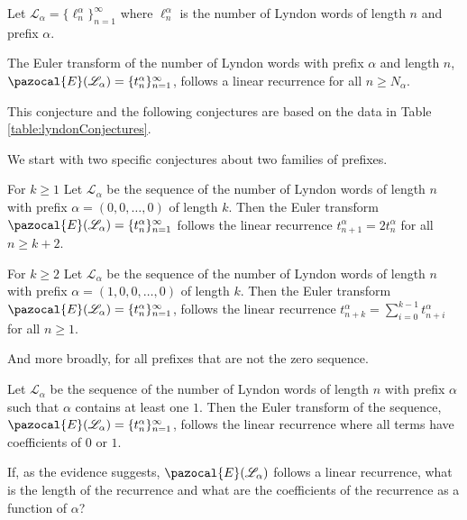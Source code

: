 \begin{definition}
  Let $\mathcal{L}_\alpha = \{\ell_n^\alpha\}_{n=1}^\infty$ where
  $\ell_n^\alpha$ is the number of Lyndon words of length $n$ and prefix
  $\alpha$.
\end{definition}

\begin{conjecture}
  The Euler transform of the number of Lyndon words with prefix $\alpha$ and
  length $n$,
  $\pazocal{E}(\mathcal{L_\alpha}) = \{t_{n}^\alpha\}_{n=1}^\infty$,
  follows a linear recurrence for all $n \geq N_\alpha$.
\end{conjecture}

This conjecture and the following conjectures are based on the data
in Table \ref{table:lyndonConjectures}.

We start with two specific conjectures about two families of prefixes.
\begin{conjecture}
  For $k \geq 1$
  Let $\mathcal{L}_\alpha$ be the sequence of the
  number of Lyndon words of length $n$ with prefix
  ${\alpha = (0, 0, \dots, 0)}$ of length $k$.
  Then the Euler transform
  $\pazocal{E}(\mathcal{L}_\alpha) = \{t_{n}^\alpha\}_{n=1}^\infty$
  follows the linear recurrence $t_{n+1}^\alpha = 2t_{n}^\alpha$ for all
  $n \geq k + 2$.
\end{conjecture}

\begin{conjecture}
  For $k \geq 2$
  Let $\mathcal{L}_\alpha$ be the sequence of the
  number of Lyndon words of length $n$ with prefix
  ${\alpha = (1, 0, 0, \dots, 0)}$ of length $k$.
  Then the Euler transform
  $\pazocal{E}(\mathcal{L}_\alpha) = \{t_{n}^\alpha\}_{n=1}^\infty$,
  follows the linear recurrence $t_{n+k}^\alpha = \sum_{i=0}^{k-1} t_{n+i}^\alpha$
  for all $n \geq 1$.
\end{conjecture}

And more broadly, for all prefixes that are not the zero sequence.
\begin{conjecture}
  Let $\mathcal{L}_\alpha$ be the sequence of the
  number of Lyndon words of length $n$ with prefix $\alpha$ such that $\alpha$
  contains at least one $1$.
  Then the Euler transform of the sequence,
  $\pazocal{E}(\mathcal{L_\alpha}) = \{t_{n}^\alpha\}_{n=1}^\infty$,
  follows the linear recurrence where all terms have coefficients of $0$ or $1$.
\end{conjecture}

\begin{openquestion}
  If, as the evidence suggests, $\pazocal{E}(\mathcal{L_\alpha})$ follows a
  linear recurrence,
  what is the length of the recurrence and
  what are the coefficients of the recurrence
  as a function of $\alpha$?
\end{openquestion}




